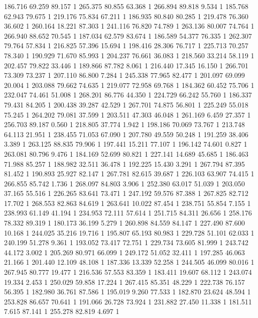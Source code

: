 	186.716	69.259	89.157	1
	265.375	80.855	63.368	1
	266.894	89.818	9.534	1
	185.768	62.943	79.675	1
	219.176	75.834	67.211	1
	186.935	80.840	80.285	1
	219.478	76.360	36.602	1
	260.164	18.221	87.303	1
	241.116	76.820	74.789	1
	263.136	80.007	74.764	1
	266.940	88.652	70.545	1
	187.034	62.579	83.674	1
	186.589	54.377	76.335	1
	262.307	79.764	57.834	1
	216.825	57.396	15.694	1
	198.416	28.306	76.717	1
	225.713	70.257	78.340	1
	190.929	71.670	85.993	1
	204.237	76.661	36.083	1
	218.560	33.214	58.119	1
	202.457	79.822	33.446	1
	189.866	87.782	8.061	1
	216.440	17.345	16.150	1
	266.701	73.309	73.237	1
	207.110	86.800	7.284	1
	245.338	77.965	82.477	1
	201.097	69.099	20.004	1
	203.088	79.662	74.635	1
	219.077	72.958	69.768	1
	184.362	60.452	75.706	1
	232.047	74.461	51.008	1
	268.201	86.776	44.350	1
	224.729	66.242	55.760	1
	186.337	79.431	84.205	1
	200.438	39.287	42.529	1
	267.701	74.875	56.801	1
	225.249	55.018	75.245	1
	264.202	79.081	37.599	1
	203.511	47.303	46.048	1
	261.169	6.459	27.357	1
	256.703	89.187	0.560	1
	218.805	37.774	1.942	1
	198.186	70.069	73.767	1
	213.748	64.113	21.951	1
	238.455	71.053	67.090	1
	207.780	49.559	50.248	1
	191.259	38.406	3.389	1
	263.125	88.835	79.906	1
	197.441	15.211	77.107	1
	196.142	74.601	0.827	1
	263.081	80.796	9.476	1
	184.169	52.699	80.821	1
	227.141	14.689	45.685	1
	186.463	71.988	85.257	1
	188.982	32.511	36.478	1
	192.225	15.430	3.291	1
	267.794	87.395	81.452	1
	190.893	25.927	82.147	1
	267.781	82.615	39.687	1
	226.103	63.907	74.415	1
	266.855	85.742	1.736	1
	268.097	84.803	3.906	1
	252.380	63.017	51.039	1
	203.050	37.165	55.516	1
	226.265	83.641	73.471	1
	247.192	59.576	87.388	1
	267.825	82.712	17.702	1
	268.553	82.863	84.619	1
	263.641	10.022	87.454	1
	238.751	55.854	7.155	1
	238.993	61.149	41.194	1
	234.953	72.111	57.614	1
	251.715	84.311	26.656	1
	258.176	78.332	89.319	1
	180.173	36.199	5.279	1
	260.898	84.559	84.147	1
	227.490	87.600	10.168	1
	244.025	35.216	19.716	1
	195.807	65.193	80.983	1
	229.728	51.101	62.033	1
	240.199	51.278	9.361	1
	193.052	73.417	72.751	1
	229.734	73.605	81.999	1
	243.742	44.172	3.002	1
	205.269	80.971	66.099	1
	249.172	51.052	32.411	1
	197.285	46.063	21.166	1
	201.440	12.109	48.108	1
	187.336	13.339	52.258	1
	244.505	46.099	80.016	1
	267.945	80.777	19.477	1
	216.536	57.553	83.359	1
	183.411	19.607	68.112	1
	243.074	19.334	2.453	1
	250.029	59.858	17.224	1
	267.415	85.351	48.229	1
	222.738	76.157	56.395	1
	182.980	36.761	87.586	1
	195.019	9.260	77.533	1
	182.870	23.624	48.594	1
	253.828	86.657	70.641	1
	191.066	26.728	73.924	1
	231.882	27.450	11.338	1
	181.511	7.615	87.141	1
	255.278	82.819	4.697	1
